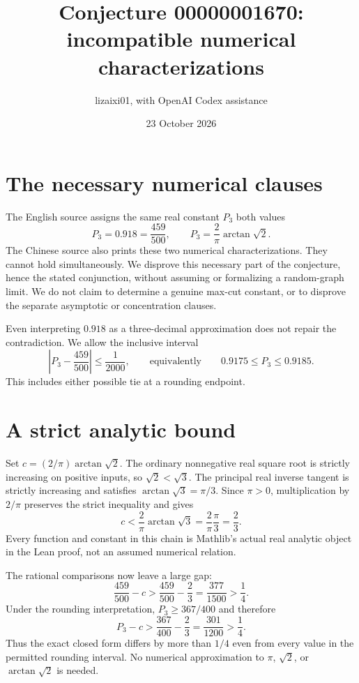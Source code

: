 \documentclass[11pt]{article}
\title{Conjecture 00000001670: incompatible numerical characterizations}
\author{lizaixi01, with OpenAI Codex assistance}
\date{23 October 2026}
\begin{document}
\maketitle
\section{The necessary numerical clauses}
The English source assigns the same real constant $P_3$ both values
\[
 P_3=0.918=\frac{459}{500},\qquad
 P_3=\frac{2}{\pi}\arctan\sqrt2.
\]
The Chinese source also prints these two numerical characterizations.
They cannot hold simultaneously. We disprove this necessary part of the
conjecture, hence the stated conjunction, without assuming or formalizing
a random-graph limit. We do not claim to determine a genuine max-cut
constant, or to disprove the separate asymptotic or concentration clauses.

Even interpreting $0.918$ as a three-decimal approximation does not repair
the contradiction. We allow the inclusive interval
\[
 \left|P_3-\frac{459}{500}\right|\le\frac1{2000},
 \qquad\text{equivalently}\qquad
 0.9175\le P_3\le0.9185.
\]
This includes either possible tie at a rounding endpoint.

\section{A strict analytic bound}
Set $c=(2/\pi)\arctan\sqrt2$. The ordinary nonnegative real square
root is strictly increasing on positive inputs, so $\sqrt2<\sqrt3$.
The principal real inverse tangent is strictly increasing and satisfies
$\arctan\sqrt3=\pi/3$. Since $\pi>0$, multiplication by $2/\pi$
preserves the strict inequality and gives
\[
 c<\frac2\pi\arctan\sqrt3
   =\frac2\pi\frac\pi3=\frac23.
\]
Every function and constant in this chain is Mathlib's actual real
analytic object in the Lean proof, not an assumed numerical relation.

The rational comparisons now leave a large gap:
\[
 \frac{459}{500}-c>
 \frac{459}{500}-\frac23=\frac{377}{1500}>\frac14.
\]
Under the rounding interpretation, $P_3\ge367/400$ and therefore
\[
 P_3-c>\frac{367}{400}-\frac23
   =\frac{301}{1200}>\frac14.
\]
Thus the exact closed form differs by more than $1/4$ even from every
value in the permitted rounding interval. No numerical approximation
to $\pi$, $\sqrt2$, or $\arctan\sqrt2$ is needed.

\newpage
\end{document}
